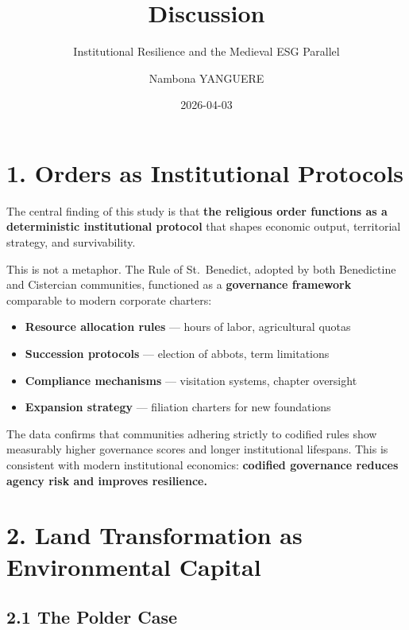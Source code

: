 \documentclass[
  11pt,
  a4paper,
]{article}
\title{Discussion}
\subtitle{Institutional Resilience and the Medieval ESG Parallel}
\author{Nambona YANGUERE}
\date{2026-04-03}
\providecommand{\tightlist}{%
  \setlength{\itemsep}{0pt}\setlength{\parskip}{0pt}}\usepackage{longtable,booktabs,array}
\renewcommand*\contentsname{Table of contents}
\newcommand\contentsname{Table of contents}
\begin{document}
\maketitle

\renewcommand*\contentsname{Table of contents}
{
\hypersetup{linkcolor=}
\setcounter{tocdepth}{3}
\tableofcontents
}

\section{1. Orders as Institutional
Protocols}\label{orders-as-institutional-protocols}

The central finding of this study is that \textbf{the religious order
functions as a deterministic institutional protocol} that shapes
economic output, territorial strategy, and survivability.

This is not a metaphor. The Rule of St.~Benedict, adopted by both
Benedictine and Cistercian communities, functioned as a
\textbf{governance framework} comparable to modern corporate charters:

\begin{itemize}
\tightlist
\item
  \textbf{Resource allocation rules} --- hours of labor, agricultural
  quotas
\item
  \textbf{Succession protocols} --- election of abbots, term limitations
\item
  \textbf{Compliance mechanisms} --- visitation systems, chapter
  oversight
\item
  \textbf{Expansion strategy} --- filiation charters for new foundations
\end{itemize}

The data confirms that communities adhering strictly to codified rules
show measurably higher governance scores and longer institutional
lifespans. This is consistent with modern institutional economics:
\textbf{codified governance reduces agency risk and improves
resilience.}

\section{2. Land Transformation as Environmental
Capital}\label{land-transformation-as-environmental-capital}

\subsection{2.1 The Polder Case}\label{the-polder-case}
\end{document}

